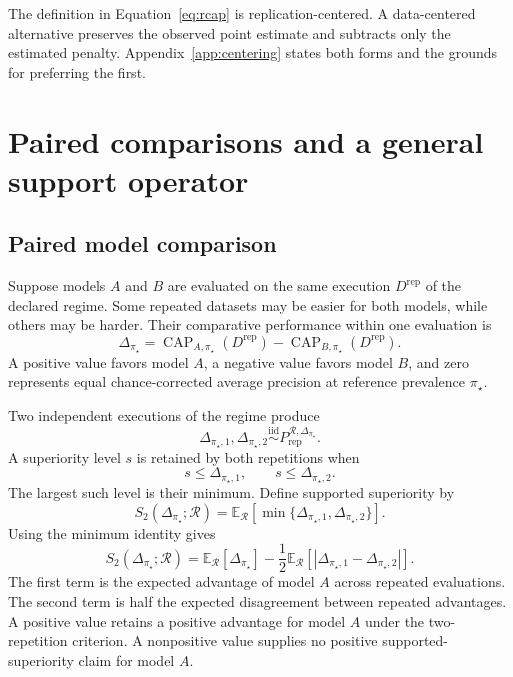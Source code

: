 \documentclass[11pt]{article}
\newcommand{\CAP}{\operatorname{CAP}}
\newcommand{\Regime}{\mathcal{R}}
\newcommand{\E}{\mathbb{E}}
\newcommand{\iid}{\mathrel{\overset{\mathrm{iid}}{\sim}}}
\theoremstyle{remark}
\begin{document}
The definition in Equation~\eqref{eq:rcap} is replication-centered. A data-centered alternative preserves the observed point estimate and subtracts only the estimated penalty. Appendix~\ref{app:centering} states both forms and the grounds for preferring the first.

\section{Paired comparisons and a general support operator}
\label{sec:paired}

\subsection{Paired model comparison}

Suppose models $A$ and $B$ are evaluated on the same execution $D^{\mathrm{rep}}$ of the declared regime. Some repeated datasets may be easier for both models, while others may be harder. Their comparative performance within one evaluation is
\begin{equation}
\Delta_{\pi_\star}
=
\CAP_{A,\pi_\star}(D^{\mathrm{rep}})
-
\CAP_{B,\pi_\star}(D^{\mathrm{rep}}).
\label{eq:paired-difference}
\end{equation}
A positive value favors model $A$, a negative value favors model $B$, and zero represents equal chance-corrected average precision at reference prevalence $\pi_\star$.

Two independent executions of the regime produce
\[
\Delta_{\pi_\star,1},
\Delta_{\pi_\star,2}
\iid
P_{\mathrm{rep}}^{\Regime,\Delta_{\pi_\star}}.
\]
A superiority level $s$ is retained by both repetitions when
\[
s\leq \Delta_{\pi_\star,1},
\qquad
s\leq \Delta_{\pi_\star,2}.
\]
The largest such level is their minimum. Define supported superiority by
\begin{equation}
S_2(\Delta_{\pi_\star};\Regime)
=
\E_{\Regime}
\left[
\min\{
\Delta_{\pi_\star,1},
\Delta_{\pi_\star,2}
\}
\right].
\label{eq:paired}
\end{equation}
Using the minimum identity gives
\begin{equation}
S_2(\Delta_{\pi_\star};\Regime)
=
\E_{\Regime}[\Delta_{\pi_\star}]
-
\frac12
\E_{\Regime}
\left[
|\Delta_{\pi_\star,1}-\Delta_{\pi_\star,2}|
\right].
\label{eq:paired-decomposition}
\end{equation}
The first term is the expected advantage of model $A$ across repeated evaluations. The second term is half the expected disagreement between repeated advantages. A positive value retains a positive advantage for model $A$ under the two-repetition criterion. A nonpositive value supplies no positive supported-superiority claim for model $A$.
\end{document}
